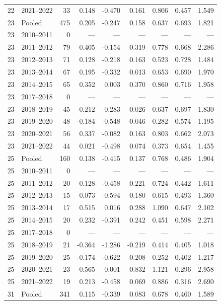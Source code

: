 \begin{longtable}{llrrrrrrr}
22 & 2021--2022 & 33 & 0.148 & -0.470 & 0.161 & 0.806 & 0.457 & 1.549 \\
23 & Pooled & 475 & 0.205 & -0.247 & 0.158 & 0.637 & 0.693 & 1.821 \\
23 & 2010--2011 & 0 & --- & --- & --- & --- & --- & --- \\
23 & 2011--2012 & 79 & 0.405 & -0.154 & 0.319 & 0.778 & 0.668 & 2.286 \\
23 & 2012--2013 & 71 & 0.128 & -0.218 & 0.163 & 0.523 & 0.728 & 1.484 \\
23 & 2013--2014 & 67 & 0.195 & -0.332 & 0.013 & 0.653 & 0.690 & 1.970 \\
23 & 2014--2015 & 65 & 0.352 & 0.003 & 0.370 & 0.860 & 0.716 & 1.958 \\
23 & 2017--2018 & 0 & --- & --- & --- & --- & --- & --- \\
23 & 2018--2019 & 45 & 0.212 & -0.283 & 0.026 & 0.637 & 0.697 & 1.830 \\
23 & 2019--2020 & 48 & -0.184 & -0.548 & -0.046 & 0.282 & 0.574 & 1.195 \\
23 & 2020--2021 & 56 & 0.337 & -0.082 & 0.163 & 0.803 & 0.662 & 2.073 \\
23 & 2021--2022 & 44 & 0.021 & -0.498 & 0.074 & 0.373 & 0.654 & 1.455 \\
25 & Pooled & 160 & 0.138 & -0.415 & 0.137 & 0.768 & 0.486 & 1.904 \\
25 & 2010--2011 & 0 & --- & --- & --- & --- & --- & --- \\
25 & 2011--2012 & 20 & 0.128 & -0.458 & 0.221 & 0.724 & 0.442 & 1.611 \\
25 & 2012--2013 & 15 & 0.073 & -0.594 & 0.180 & 0.615 & 0.493 & 1.360 \\
25 & 2013--2014 & 17 & 0.515 & 0.016 & 0.288 & 1.090 & 0.647 & 2.102 \\
25 & 2014--2015 & 20 & 0.232 & -0.391 & 0.242 & 0.451 & 0.598 & 2.271 \\
25 & 2017--2018 & 0 & --- & --- & --- & --- & --- & --- \\
25 & 2018--2019 & 21 & -0.364 & -1.286 & -0.219 & 0.414 & 0.405 & 1.018 \\
25 & 2019--2020 & 25 & -0.174 & -0.622 & -0.208 & 0.252 & 0.402 & 1.217 \\
25 & 2020--2021 & 23 & 0.565 & -0.001 & 0.832 & 1.121 & 0.296 & 2.958 \\
25 & 2021--2022 & 19 & 0.213 & -0.458 & 0.069 & 0.886 & 0.316 & 2.690 \\
31 & Pooled & 341 & 0.115 & -0.339 & 0.083 & 0.678 & 0.460 & 1.589 \\

\end{longtable}

